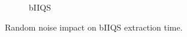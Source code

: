 \begin{figure}
\begin{subfigure}[b]{0.45\textwidth}
        \caption{bIIQS}
        \label{FIG:WORKHORSE_BENCHMARK_07__0_1}
    \end{subfigure}

    \caption{Random noise impact on bIIQS extraction time.}
    \label{FIG:WORKHORSE_BENCHMARK_07}
\end{figure}


